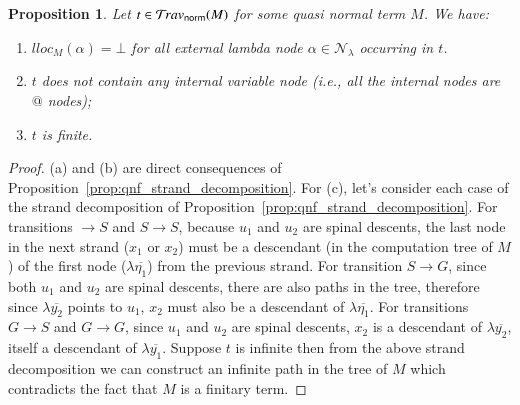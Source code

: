 \documentclass{elsarticle}
\makeatletter
\theoremstyle{plain}
\newtheorem{proposition}[theorem]{Proposition}
\theoremstyle{definition}
\theoremstyle{remark}
\newcommand\Nodes{\mathcal{N}}%
\newcommand\NodesLmd{\Nodes_\lambda}%
\newcommand{\normalizing}{{\sf norm}}
\newcommand{\travsetnorm}{\travset_\normalizing}
\renewcommand\ie{{\it i.e.\@\xspace}}
\makeatother
\begin{document}
\begin{proposition}
\label{prop:qnf_traversals_are_finite}
Let $t \in \travsetnorm(M)$ for some \emph{quasi normal} term $M$. We have:
\begin{enumerate}[label=(\alph*), nosep]
\item $lloc_M(\alpha) = \bot$ for all external lambda node $\alpha \in \NodesLmd$ occurring in $t$.
\item $t$ does not contain any internal variable node (\ie, all the internal nodes are $@$ nodes);
\item $t$ is finite.
\end{enumerate}
\end{proposition}
\begin{proof}
(a) and (b) are direct consequences of Proposition~\ref{prop:qnf_strand_decomposition}.
For (c), let's consider each case of the strand decomposition of Proposition~\ref{prop:qnf_strand_decomposition}. For transitions $\rightarrow S$ and $S \rightarrow S$, because $u_1$ and $u_2$ are spinal descents, the last node in the next strand ($x_1$ or $x_2$) must be a descendant (in the computation tree of $M$) of the first node ($\lambda\overline{\eta_1}$) from the previous strand.
For transition $S\rightarrow G$, since both $u_1$ and $u_2$ are spinal descents, there are also paths in the tree, therefore since $\lambda\overline{y_2}$ points to $u_1$, $x_2$ must also be a descendant of $\lambda\overline{\eta_1}$. For transitions $G \rightarrow S$ and $G \rightarrow G$, since $u_1$ and $u_2$ are spinal descents, $x_2$ is a descendant of $\lambda\overline{y_2}$, itself a descendant of $\lambda\overline{y_1}$.
Suppose $t$ is infinite then from the above strand decomposition we can construct an infinite path in the tree of $M$ which contradicts the fact that $M$ is a finitary term.
\end{proof}
\end{document}
